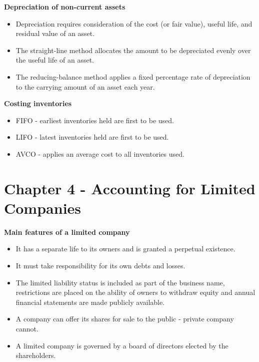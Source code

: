 \documentclass{report}
\begin{document}
\textbf{Depreciation of non-current assets}
\begin{itemize}
    \item Depreciation requires consideration of the cost (or fair value), useful life, and residual value of an asset.
    \item The straight-line method allocates the amount to be depreciated evenly over the useful life of an asset.
    \item The reducing-balance method applies a fixed percentage rate of depreciation to the carrying amount of an asset each year.\\
\end{itemize}

\textbf{Costing inventories}
\begin{itemize}
    \item FIFO - earliest inventories held are first to be used.
    \item LIFO - latest inventories held are first to be used.
    \item AVCO - applies an average cost to all inventories used.
\end{itemize}

\section{Chapter 4 - Accounting for Limited Companies}

\textbf{Main features of a limited company}
\begin{itemize}
    \item It has a separate life to its owners and is granted a perpetual existence.
    \item It must take responsibility for its own debts and losses.
    \item The limited liability status is included as part of the business name, restrictions are placed on the ability of owners to withdraw equity and annual financial statements are made publicly available.
    \item A company can offer its shares for sale to the public - private company cannot.
    \item A limited company is governed by a board of directors elected by the shareholders.\\
\end{itemize}
\end{document}

